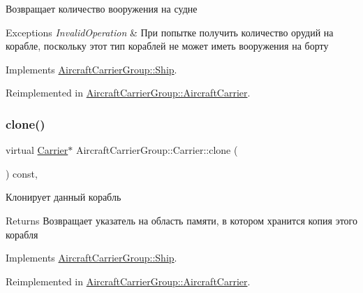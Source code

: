 Возвращает количество вооружения на судне 


\begin{DoxyExceptions}{Exceptions}
{\em Invalid\+Operation} & При попытке получить количество орудий на корабле, поскольку этот тип кораблей не может иметь вооружения на борту \\
\hline
\end{DoxyExceptions}


Implements \mbox{\hyperlink{class_aircraft_carrier_group_1_1_ship_ab082a4331c038ece44b7304b7d3c212c}{Aircraft\+Carrier\+Group\+::\+Ship}}.



Reimplemented in \mbox{\hyperlink{class_aircraft_carrier_group_1_1_aircraft_carrier_abddfdb193451143aa371c5fb86705afb}{Aircraft\+Carrier\+Group\+::\+Aircraft\+Carrier}}.

\mbox{\label{class_aircraft_carrier_group_1_1_carrier_acb567d5ef451d10187f46c34653626e1}} 
\subsubsection{\texorpdfstring{clone()}{clone()}}
{\footnotesize\ttfamily virtual \mbox{\hyperlink{class_aircraft_carrier_group_1_1_carrier}{Carrier}}$\ast$ Aircraft\+Carrier\+Group\+::\+Carrier\+::clone (\begin{DoxyParamCaption}{ }\end{DoxyParamCaption}) const\hspace{0.3cm}{\ttfamily [inline]}, {\ttfamily [virtual]}}



Клонирует данный корабль 

\begin{DoxyReturn}{Returns}
Возвращает указатель на область памяти, в котором хранится копия этого корабля 
\end{DoxyReturn}


Implements \mbox{\hyperlink{class_aircraft_carrier_group_1_1_ship_aec409c849026fa7d242fdd7de7ae9f02}{Aircraft\+Carrier\+Group\+::\+Ship}}.



Reimplemented in \mbox{\hyperlink{class_aircraft_carrier_group_1_1_aircraft_carrier_ab2f921c586a31f9933874f437baf9c16}{Aircraft\+Carrier\+Group\+::\+Aircraft\+Carrier}}.

